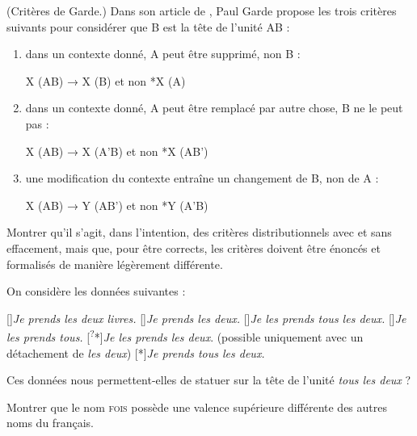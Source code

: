 {     (Critères de Garde.) Dans son article de \citeyear{garde1977ordre}, Paul Garde propose les trois critères suivants pour considérer que B est la tête de l’unité AB :
    
        \begin{enumerate}
        \item dans un contexte donné, A peut être supprimé, non B :

        \begin{center} X (AB) → X (B) et non *X (A) \end{center}

       \item dans un contexte donné, A peut être remplacé par autre chose, B ne le peut pas :

        \begin{center} X (AB) → X (A’B) et non *X (AB’) \end{center}

       \item une modification du contexte entraîne un changement de B, non de A :

        \begin{center}  X (AB) → Y (AB’) et non *Y (A’B) \end{center}
        \end{enumerate}

   \noindent Montrer qu’il s’agit, dans l’intention, des critères distributionnels avec et sans effacement, mais que, pour être corrects, les critères doivent être énoncés et formalisés de manière légèrement différente.

     On considère les données suivantes :
    
    \begin{exe}
     []{\textit{Je prends les deux livres.}}
     []{\textit{Je prends les deux.}}
     []{\textit{Je les prends tous les deux.}}
     []{\textit{Je les prends tous.}}
     [\textsuperscript{?}*]{\textit{{Je les prends les deux}}. (possible uniquement avec un détachement de \textit{les deux})}
     [*]{\textit{Je prends tous les deux.}}
     \end{exe}
    Ces données nous permettent-elles de statuer sur la tête de l’unité \textit{tous les deux} ?

     Montrer que le nom \textsc{fois} possède une valence supérieure différente des autres noms du français.

}
